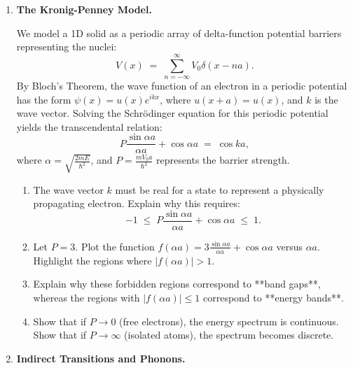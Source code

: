 \documentclass[12pt, a4paper]{book}
\begin{document}
\begin{deepbox}
\begin{enumerate}[label=\textbf{D\arabic*.}]
  \item \textbf{The Kronig-Penney Model.}
  
        We model a 1D solid as a periodic array of delta-function potential barriers representing the nuclei:
        \[
          V(x) \;=\; \sum_{n=-\infty}^\infty V_0 \delta(x - na).
        \]
        By Bloch's Theorem, the wave function of an electron in a periodic potential has the form $\psi(x) = u(x) e^{i k x}$, where $u(x + a) = u(x)$, and $k$ is the wave vector.
        Solving the Schrödinger equation for this periodic potential yields the transcendental relation:
        \[
          P \frac{\sin \alpha a}{\alpha a} + \cos \alpha a \;=\; \cos ka,
        \]
        where $\alpha = \sqrt{\frac{2mE}{\hbar^2}}$, and $P = \frac{m V_0 a}{\hbar^2}$ represents the barrier strength.
        \begin{enumerate}[label=(\alph*)]
          \item The wave vector $k$ must be real for a state to represent a physically propagating electron. Explain why this requires:
          \[
            -1 \;\le\; P \frac{\sin \alpha a}{\alpha a} + \cos \alpha a \;\le\; 1.
          \]
          \item Let $P = 3$. Plot the function $f(\alpha a) = 3 \frac{\sin \alpha a}{\alpha a} + \cos \alpha a$ versus $\alpha a$.
                Highlight the regions where $|f(\alpha a)| > 1$.
          \item Explain why these forbidden regions correspond to **band gaps**, whereas the regions with $|f(\alpha a)| \le 1$ correspond to **energy bands**.
          \item Show that if $P \to 0$ (free electrons), the energy spectrum is continuous. Show that if $P \to \infty$ (isolated atoms), the spectrum becomes discrete.
        \end{enumerate}

  \item \textbf{Indirect Transitions and Phonons.}
  

\end{enumerate}
\end{deepbox}
\end{document}
